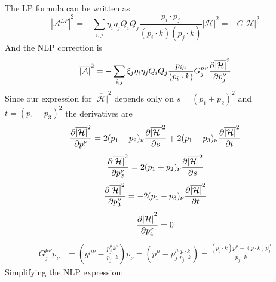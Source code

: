 \documentclass{article}
\begin{document}
The LP formula can be written as
\begin{equation}
	\overline{|\mathcal{A}^{LP}|}^2 = - \sum_{i, j} \eta_i \eta_j Q_i Q_j \frac{p_i \cdot p_j}{(p_i \cdot k)(p_j \cdot k)}\overline{|\mathcal{H}|}^2 = -C \overline{|\mathcal{H}|}^2
\end{equation}
And the NLP correction is
\begin{equation}
	\overline{|\mathcal{A}|}^2 = - \sum_{i, j} \xi_j\eta_i \eta_j Q_i Q_j \frac{p_{i\mu}}{(p_i \cdot k)} G_j^{\mu\nu}\pdv{\overline{|\mathcal{H}|}^2}{p_j^\nu}
\end{equation}
Since our expression for $\overline{|\mathcal{H}|}^2$ depends only on $s=(p_1+p_2)^2$ and $t=(p_1-p_3)^2$ the derivatives are
\begin{equation}
	\pdv{\overline{|\mathcal{H}|}^2}{p_1^\nu} = 2(p_1+p_2)_\nu\pdv{\overline{|\mathcal{H}|}^2}{s} + 2(p_1-p_3)_\nu\pdv{\overline{|\mathcal{H}|}^2}{t}
\end{equation}
\begin{equation}
	\pdv{\overline{|\mathcal{H}|}^2}{p_2^\nu} = 2(p_1+p_2)_\nu\pdv{\overline{|\mathcal{H}|}^2}{s}
\end{equation}
\begin{equation}
	\pdv{\overline{|\mathcal{H}|}^2}{p_3^\nu} = -2(p_1-p_3)_\nu\pdv{\overline{|\mathcal{H}|}^2}{t}
\end{equation}
\begin{equation}
	\pdv{\overline{|\mathcal{H}|}^2}{p_4^\nu} = 0
\end{equation}
\begin{align*}
	G_j^{\mu\nu}p_\nu &
	= \left(g^{\mu\nu} - \frac{p_j^\mu k^\nu}{p_j\cdot k}\right)p_\nu
	= \left(p^\mu - p_j^\mu\frac{p\cdot k}{p_j\cdot k}\right)
	= \frac{(p_j\cdot k)p^\mu - (p\cdot k)p_j^\mu}{p_j\cdot k}
\end{align*}
Simplifying the NLP expression;
\end{document}

